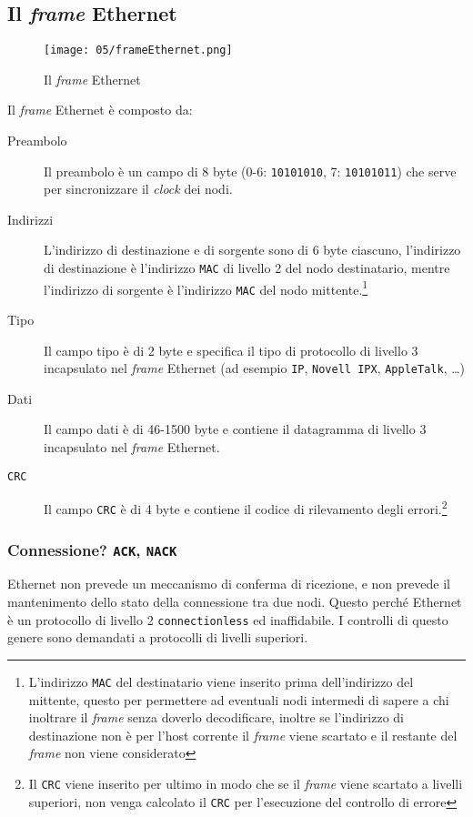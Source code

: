         \subsection{Il \textit{frame} Ethernet} 
            \begin{figure}[H]
                \centering
                \texttt{[image: 05/frameEthernet.png]}
                \caption{Il \textit{frame} Ethernet}
            \end{figure}
            Il \textit{frame} Ethernet è composto da:
            \begin{description}
                \item[Preambolo] Il preambolo è un campo di 8 byte (0-6: \texttt{10101010}, 7: \texttt{10101011}) che serve per sincronizzare il \textit{clock} dei nodi.
                \item[Indirizzi] L'indirizzo di destinazione e di sorgente sono di 6 byte ciascuno, l'indirizzo di destinazione è l'indirizzo \texttt{MAC} di livello 2 del nodo destinatario, mentre l'indirizzo di sorgente è l'indirizzo \texttt{MAC} del nodo mittente.\footnote{L'indirizzo \texttt{MAC} del destinatario viene inserito prima dell'indirizzo del mittente, questo per permettere ad eventuali nodi intermedi di sapere a chi inoltrare il \textit{frame} senza doverlo decodificare, inoltre se l'indirizzo di destinazione non è per l'host corrente il \textit{frame} viene scartato e il restante del \textit{frame} non viene considerato}
                \item[Tipo] Il campo tipo è di 2 byte e specifica il tipo di protocollo di livello 3 incapsulato nel \textit{frame} Ethernet (ad esempio \texttt{IP}, \texttt{Novell IPX}, \texttt{AppleTalk}, \dots)
                \item[Dati] Il campo dati è di 46-1500 byte e contiene il datagramma di livello 3 incapsulato nel \textit{frame} Ethernet.
                \item[\texttt{CRC}] Il campo \texttt{CRC} è di 4 byte e contiene il codice di rilevamento degli errori.\footnote{Il \texttt{CRC} viene inserito per ultimo in modo che se il \textit{frame} viene scartato a livelli superiori, non venga calcolato il \texttt{CRC} per l'esecuzione del controllo di errore} 
            \end{description}
        \subsubsection{Connessione? \texttt{ACK}, \texttt{NACK}} Ethernet non prevede un meccanismo di conferma di ricezione, e non prevede il mantenimento dello stato della connessione tra due nodi. Questo perché Ethernet è un protocollo di livello 2 \texttt{connectionless} ed inaffidabile. I controlli di questo genere sono demandati a protocolli di livelli superiori.
